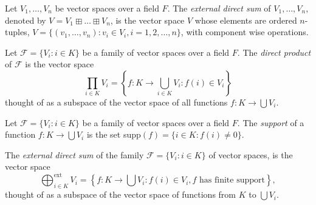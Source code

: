 \documentclass[12pt]{article}
\begin{document}
\begin{definition}
    Let $V_1,\dots,V_n$ be vector spaces over a field $F$. The \textit{external direct sum} of $V_1,\dots,V_n$, denoted by $V=V_1\boxplus\dots\boxplus V_n$, is the vector space $V$ whose elements are ordered $n$-tuples, $V=\{(v_1,\dots,v_n): v_i\in V_i, i=1,2,\dots,n\}$, with component wise operations.
\end{definition}
\begin{definition}
    Let $\mathcal{F}=\{V_i:i\in K\}$ be a family of vector spaces over a field $F$. The \textit{direct product} of $\mathcal{F}$ is the vector space
    \begin{equation*}
        \prod_{i\in K} V_i=\left\{f:K\to\bigcup_{i\in K} V_i : f(i)\in V_i \right\}
    \end{equation*}
    thought of as a subspace of the vector space of all functions $f:K\to\bigcup V_i$.
\end{definition}
\begin{definition}[Support]
    Let $\mathcal{F}=\{V_i:i\in K\}$ be a family of vector spaces over a field $F$. The \textit{support} of a function $f:K\to\bigcup V_i$ is the set supp$(f)=\{i\in K: f(i)\neq 0\}$.
\end{definition}
\begin{definition}
    The \textit{external direct sum} of the family $\mathcal{F}=\{V_i:i\in K\}$ of vector spaces, is the vector space
    \begin{equation*}
        \bigoplus_{i\in K}^\text{ext}V_i=\left\{f:K\to \bigcup V_i: f(i)\in V_i, f\text{ has finite support} \right\},
    \end{equation*}
    thought of as a subspace of the vector space of functions from $K$ to $\bigcup V_i$.
\end{definition}
\end{document}

